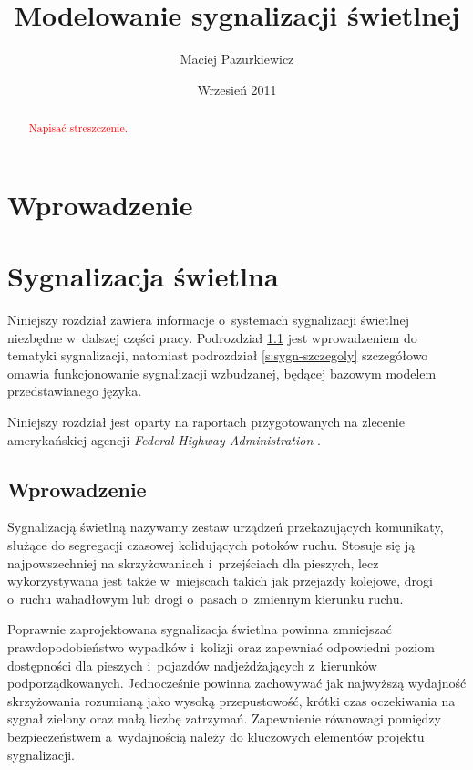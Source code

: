 \documentclass{pracamgr}
\author{Maciej Pazurkiewicz}
\title{Modelowanie sygnalizacji świetlnej}
\date{Wrzesień 2011}
\newcommand{\todo}[1]{\textcolor{red}{#1}}
\theoremstyle{plain}
\begin{document}
\maketitle

\begin{abstract}
  \todo{Napisać streszczenie.}
\end{abstract}

\tableofcontents

\chapter*{Wprowadzenie} 

\chapter{Sygnalizacja świetlna}
\label{c:sygnalizacja}

Niniejszy rozdział zawiera informacje o~systemach sygnalizacji
świetlnej niezbędne w~dalszej części pracy. Podrozdział
\ref{s:sygn-wprowadzenie} jest wprowadzeniem do tematyki sygnalizacji,
natomiast podrozdział \ref{s:sygn-szczegoly} szczegółowo omawia
funkcjonowanie sygnalizacji wzbudzanej, będącej bazowym modelem
przedstawianego języka.

Niniejszy rozdział jest oparty na raportach przygotowanych na zlecenie
amerykańskiej agencji \emph{Federal Highway Administration}
\cite{fhwa:handbook06} \cite{fhwa:timing08}.

\section{Wprowadzenie}
\label{s:sygn-wprowadzenie}

Sygnalizacją świetlną nazywamy zestaw urządzeń przekazujących
komunikaty, służące do segregacji czasowej kolidujących potoków
ruchu. Stosuje się ją najpowszechniej na skrzyżowaniach i~przejściach
dla pieszych, lecz wykorzystywana jest także w~miejscach takich jak
przejazdy kolejowe, drogi o~ruchu wahadłowym lub drogi o~pasach
o~zmiennym kierunku ruchu.

Poprawnie zaprojektowana sygnalizacja świetlna powinna zmniejszać
prawdopodobieństwo wypadków i~kolizji oraz zapewniać odpowiedni poziom
dostępności dla pieszych i~pojazdów nadjeżdżających z~kierunków
podporządkowanych. Jednocześnie powinna zachowywać jak najwyższą
wydajność skrzyżowania rozumianą jako wysoką przepustowość, krótki
czas oczekiwania na sygnał zielony oraz małą liczbę
zatrzymań. Zapewnienie równowagi pomiędzy bezpieczeństwem a~wydajnością
należy do kluczowych elementów projektu sygnalizacji.
\end{document}
